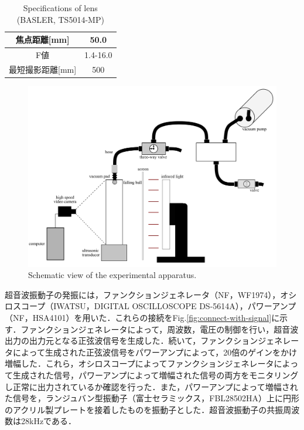 \begin{table}[ht]
    \centering
    \caption{Specifications of lens (BASLER, TS5014-MP)}
    \label{table:lens}
    \begin{tabular}{c|c}\hline
        焦点距離[mm]     & 50.0     \\ \hline
        F値              & 1.4-16.0 \\ \hline
        最短撮影距離[mm] & 500      \\ \hline
    \end{tabular}
\end{table}

\begin{figure}[h]
    \centering
    \includegraphics[clip,width=15.0cm]{2-Methods/device.png}
    \caption{Schematic view of the experimental apparatus.}
    \label{fig:device}
\end{figure}

\newpage

超音波振動子の発振には，ファンクションジェネレータ（NF，WF1974），オシロスコープ（IWATSU，DIGITAL OSCILLOSCOPE DS-5614A），パワーアンプ（NF，HSA4101）を用いた．これらの接続をFig.\ref{fig:connect-with-signal}に示す．ファンクションジェネレータによって，周波数，電圧の制御を行い，超音波出力の出力元となる正弦波信号を生成した．続いて，ファンクションジェネレータによって生成された正弦波信号をパワーアンプによって，20倍のゲインをかけ増幅した．これら，オシロスコープによってファンクションジェネレータによって生成された信号，パワーアンプによって増幅された信号の両方をモニタリングし正常に出力されているか確認を行った．また，パワーアンプによって増幅された信号を，ランジュバン型振動子（富士セラミックス，FBL28502HA）上に円形のアクリル製プレートを接着したものを振動子とした．超音波振動子の共振周波数は28kHzである．


